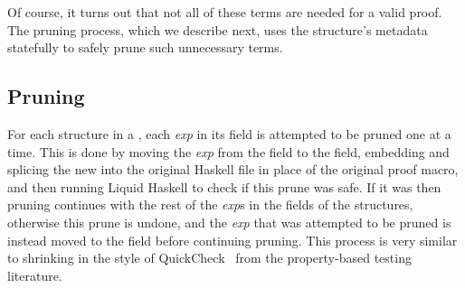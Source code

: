 
Of course, it turns out that not all of these terms are needed for a
valid proof.  The pruning process, which we describe next, uses the
 structure's metadata statefully to safely prune such
unnecessary terms.
  
\subsection{Pruning}


For each  structure in a \LangBTerm, each \textit{exp} in its  field is attempted to be pruned one at a time.
This is done by moving the \textit{exp} from the  field to the  field, embedding and splicing the new \LangBTerm into the original Haskell file in place of the original proof macro, and then running Liquid Haskell to check if this prune was safe.
If it was then pruning continues with the rest of the \textit{exp}s in the  fields of the  structures, otherwise this prune is undone, and the \textit{exp} that was attempted to be pruned is instead moved to the  field before continuing pruning.
%
This process is very similar to shrinking in the style of
QuickCheck~\cite{ClaessenH00} from the property-based testing
literature.

